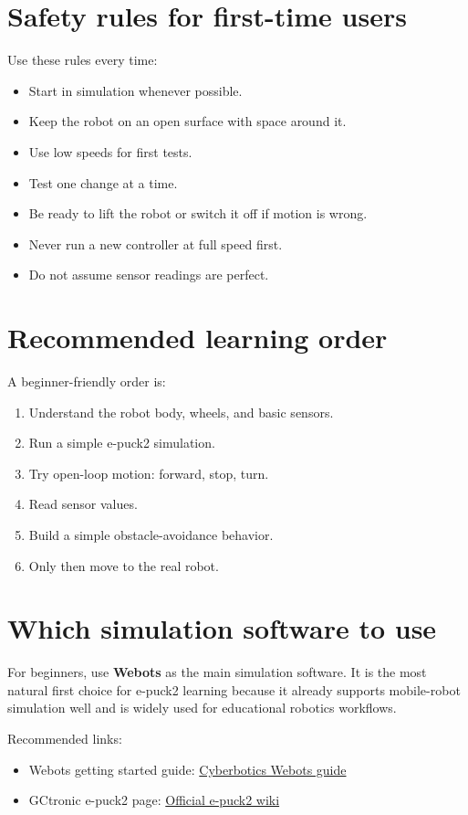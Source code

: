 \documentclass[11pt]{article}
\begin{document}
\section{Safety rules for first-time users}
Use these rules every time:
\begin{itemize}
  \item Start in simulation whenever possible.
  \item Keep the robot on an open surface with space around it.
  \item Use low speeds for first tests.
  \item Test one change at a time.
  \item Be ready to lift the robot or switch it off if motion is wrong.
  \item Never run a new controller at full speed first.
  \item Do not assume sensor readings are perfect.
\end{itemize}

\section{Recommended learning order}
A beginner-friendly order is:
\begin{enumerate}
  \item Understand the robot body, wheels, and basic sensors.
  \item Run a simple e-puck2 simulation.
  \item Try open-loop motion: forward, stop, turn.
  \item Read sensor values.
  \item Build a simple obstacle-avoidance behavior.
  \item Only then move to the real robot.
\end{enumerate}

\section{Which simulation software to use}
For beginners, use \textbf{Webots} as the main simulation software. It is the most natural first choice for e-puck2 learning because it already supports mobile-robot simulation well and is widely used for educational robotics workflows.

Recommended links:
\begin{itemize}
  \item Webots getting started guide: \href{https://cyberbotics.com/doc/guide/getting-started-with-webots?version=R2025a}{Cyberbotics Webots guide}
  \item GCtronic e-puck2 page: \href{https://www.gctronic.com/doc/index.php?title=e-puck2}{Official e-puck2 wiki}
\end{itemize}
\end{document}

